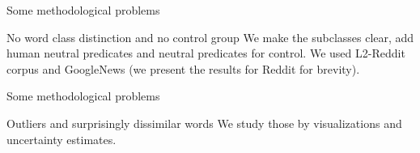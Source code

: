 \documentclass[
  10pt,
  ignorenonframetext,
  x11names, dvipsnames, bibspacing,natbib, table]{beamer}
\begin{document}
\begin{frame}{Some methodological problems}
\protect\hypertarget{some-methodological-problems-1}{}
\begin{block}{No word class distinction and no control group}
\protect\hypertarget{no-word-class-distinction-and-no-control-group}{}
We make the subclasses clear, add human neutral predicates and neutral
predicates for control. We used L2-Reddit corpus and GoogleNews (we
present the results for Reddit for brevity).

\footnotesize 
\begin{table}

\caption{\label{tab:religionTableHeadLate}Rows from extended religion dataset.}
\centering
{}
\end{table}
\normalsize
\end{block}
\end{frame}

\begin{frame}{Some methodological problems}
\protect\hypertarget{some-methodological-problems-2}{}
\begin{block}{Outliers and surprisingly dissimilar words}
\protect\hypertarget{outliers-and-surprisingly-dissimilar-words}{}
We study those by visualizations and uncertainty estimates.
\end{block}
\end{frame}
\end{document}
